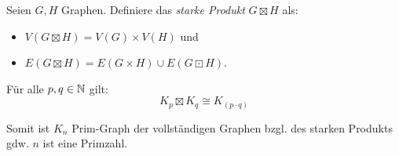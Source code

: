 \begin{definition}
    Seien $ G, H $ Graphen.
    Definiere das \textit{starke Produkt} $ G \boxtimes H $ als:
    \begin{itemize}
        \item $ V(G \boxtimes H) = V(G) \times V(H) $ und
        \item $ E(G \boxtimes H) = E(G \times H) \cup E(G \boxdot H) $.
    \end{itemize}
\end{definition}

\begin{proposition}
    Für alle $ p, q \in \mathbb{N} $ gilt:
    \begin{equation*}
        K_p \boxtimes K_q \cong K_{(p \cdot q)}
    \end{equation*}

    Somit ist $ K_n $ Prim-Graph der vollständigen Graphen bzgl. des starken Produkts gdw. $ n $ ist eine Primzahl.
\end{proposition}
